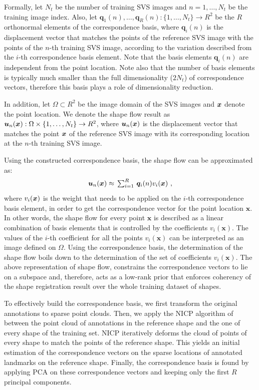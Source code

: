 Formally, let $N_t$ be the number of training SVS images and $n=1,\dots,N_t$ be the training image index. Also, let $\bm{q}_1(n),\dots,\bm{q}_R(n):\{ 1,\dots,N_t \} \rightarrow R^2$ be the $R$ orthonormal elements of the correspondence basis, where $\bm{q}_i(n)$ is the displacement vector that matches the points of the reference SVS image with the points of the $n$-th training SVS image, according to the variation described from the $i$-th correspondence basis element. Note that the basis elements $\bm{q}_i(n)$ are independent from the point location. Note also that the number of basis elements is typically much smaller than the full dimensionality ($2 N_t$) of correspondence vectors, therefore this basis plays a role of dimensionality reduction. 

In addition, let $\Omega \subset R^2$ be the image domain of the SVS images and $\bm{x}$ denote the point location. We denote the shape flow result as $\bm{u}_n(\bm{x}):\Omega\times \{1,\dots,N_t\} \rightarrow R^2$,  where $\bm{u}_n(\bm{x})$ is the displacement vector that matches the point $\bm{x}$ of the reference SVS image with its corresponding location at the $n$-th training SVS image.

Using the constructed correspondence basis, the shape flow can be approximated as:
\begin{equation}\label{eq:LinTrajModel}
    \bm{u}_n(\bm{x}) \approx
    \textstyle \, \sum_{i=1}^R \, \bm{q}_i(n)v_i(\bm{x}) \,\, ,
\end{equation}
where $v_i(\bm{x})$ is the weight that needs to be applied on the $i$-th correspondence basis element, in order to get the correspondence vector for the point location $\bm{x}$. In other words, the shape flow for every point $\bm{x}$ is described as a linear combination of basis elements that is controlled by the coefficients $v_i(\bm{x})$.
The values of the $i$-th coefficient for all the points $v_i(\bm{x})$ can be interpreted as an image defined on $\Omega$. Using the correspondence basis, the determination of the shape flow boils down to the determination of the set of coefficients $v_i(\bm{x})$. The above representation of shape flow, constrains the correspondence vectors to lie on a subspace and, therefore, acts as a low-rank prior that enforces coherency of the shape registration result over the whole training dataset of shapes.


To effectively build the correspondence basis, we first transform the original annotations to sparse point clouds. Then, we apply the NICP algorithm of~\cite{Amber2007} between the point cloud of annotations in the reference shape and the one of every shape of the training set. NICP iteratively deforms the cloud of points of every shape to match the points of the reference shape. This yields an initial estimation of the correspondence vectors on the sparse locations of annotated landmarks on the reference shape. Finally, the correspondence basis is found by applying PCA on these correspondence vectors and keeping only the first $R$ principal components.


